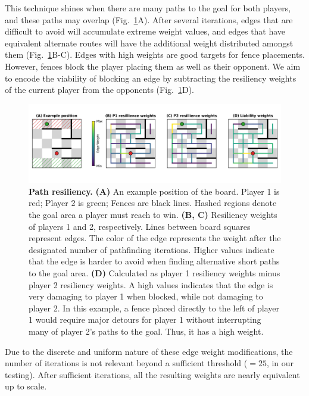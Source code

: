 \documentclass[10pt]{article}
\begin{document}
This technique shines when there are many paths to the goal for both players, and these paths may overlap (Fig.~\ref{fig:resiliency}A). After several iterations, edges that are difficult to avoid will accumulate extreme weight values, and edges that have equivalent alternate routes will have the additional weight distributed amongst them (Fig.~\ref{fig:resiliency}B-C). Edges with high weights are good targets for fence placements. However, fences block the player placing them as well as their opponent. We aim to encode the viability of blocking an edge by subtracting the resiliency weights of the current player from the opponents (Fig.~\ref{fig:resiliency}D).

\begin{figure}[H]
    \centering
    \includegraphics[width=\linewidth]{path_figure.png}
    \caption{\textbf{Path resiliency.} \textbf{(A)} An example position of the board. Player 1 is red; Player 2 is green; Fences are black lines. Hashed regions denote the goal area a player must reach to win. \textbf{(B, C)} Resiliency weights of players 1 and 2, respectively. Lines between board squares represent edges. The color of the edge represents the weight after the designated number of pathfinding iterations. Higher values indicate that the edge is harder to avoid when finding alternative short paths to the goal area. \textbf{(D)} Calculated as player 1 resiliency weights minus player 2 resiliency weights. A high values indicates that the edge is very damaging to player 1 when blocked, while not damaging to player 2. In this example, a fence placed directly to the left of player 1 would require major detours for player 1 without interrupting many of player 2's paths to the goal. Thus, it has a high weight.}
    \label{fig:resiliency}
\end{figure}

Due to the discrete and uniform nature of these edge weight modifications, the number of iterations is not relevant beyond a sufficient threshold ($=25$, in our testing). After sufficient iterations, all the resulting weights are nearly equivalent up to scale.
\end{document}
